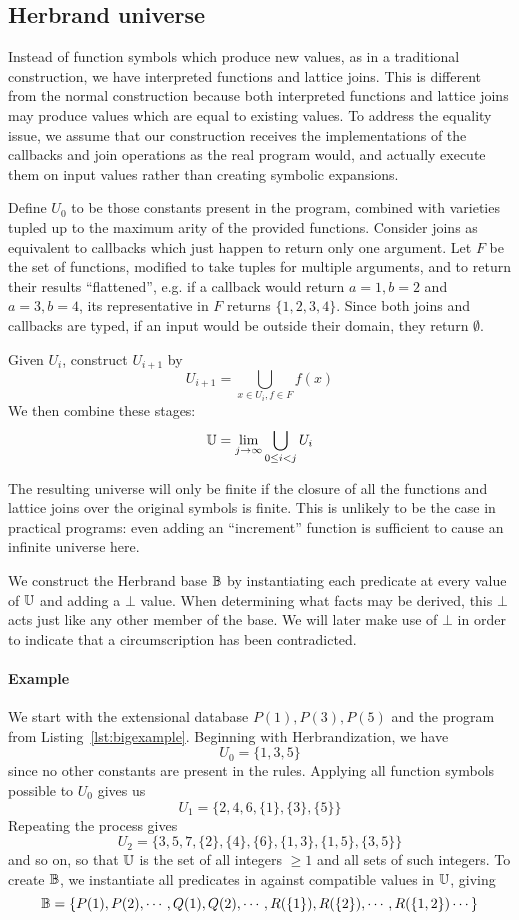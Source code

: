 \subsection{Herbrand universe}
\label{formal:sec:callbacks}
Instead of function symbols which produce new values, as in a traditional construction, we have interpreted functions and lattice joins.
This is different from the normal construction because both interpreted functions and lattice joins may produce values which are equal to existing values.
To address the equality issue, we assume that our construction receives the implementations of the callbacks and join operations as the real program would, and actually execute them on input values rather than creating symbolic expansions.

Define $U_0$ to be those constants present in the program, combined with varieties tupled up to the maximum arity of the provided functions.
Consider joins as equivalent to callbacks which just happen to return only one argument.
Let $F$ be the set of functions, modified to take tuples for multiple arguments, and to return their results ``flattened'', e.g. if a callback would return $a = 1, b = 2$ and $a = 3, b = 4$, its representative in $F$ returns $\{1, 2, 3, 4\}$.
Since both joins and callbacks are typed, if an input would be outside their domain, they return $\emptyset$.

Given $U_i$, construct $U_{i + 1}$ by
\[
	U_{i + 1} = \bigcup_{x \in U_i, f \in F} f(x)
\]
We then combine these stages:
\[
	\mathbb{U} = \lim_{j \rightarrow \infty} \bigcup_{0 \leq i < j} U_i
\]

The resulting universe will only be finite if the closure of all the functions and lattice joins over the original symbols is finite.
This is unlikely to be the case in practical programs: even adding an ``increment'' function is sufficient to cause an infinite universe here.

We construct the Herbrand base $\mathbb{B}$ by instantiating each predicate at every value of $\mathbb{U}$ and adding a $\bot$ value.
When determining what facts may be derived, this $\bot$ acts just like any other member of the base.
We will later make use of $\bot$ in order to indicate that a circumscription has been contradicted.

\paragraph{Example}
We start with the extensional database $P(1), P(3), P(5)$ and the program from Listing~\ref{lst:bigexample}.
Beginning with Herbrandization, we have
\[
	U_0 = \{1, 3, 5\}
\]
since no other constants are present in the rules.
Applying all function symbols possible to $U_0$ gives us
\[
	U_1 = \{2, 4, 6, \{1\}, \{3\}, \{5\}\}
\]
Repeating the process gives
\[
	U_2 = \{3, 5, 7, \{2\}, \{4\}, \{6\}, \{1, 3\}, \{1, 5\}, \{3, 5\}\}
\]
and so on, so that $\mathbb{U}$ is the set of all integers $\geq 1$ and all sets of such integers.
To create $\mathbb{B}$, we instantiate all predicates in against compatible values in $\mathbb{U}$, giving
\[
	\mathbb{B} = \{P(1), P(2), \cdots, Q(1), Q(2), \cdots, R(\{1\}), R(\{2\}), \cdots, R(\{1, 2\}) \cdots\}
\]

